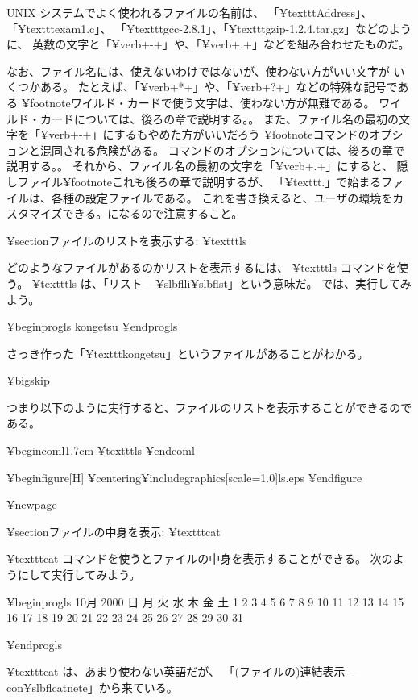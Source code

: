 UNIX システムでよく使われるファイルの名前は、
「¥texttt{Address}」、「¥texttt{exam1.c}」、
「¥texttt{gcc-2.8.1}」、「¥texttt{gzip-1.2.4.tar.gz}」などのように、
英数の文字と「¥verb+-+」や、「¥verb+.+」などを組み合わせたものだ。

なお、ファイル名には、使えないわけではないが、使わない方がいい文字が
いくつかある。
たとえば、「¥verb+*+」や、「¥verb+?+」などの特殊な記号である
¥footnote{ワイルド・カードで使う文字は、使わない方が無難である。
ワイルド・カードについては、後ろの章で説明する。}。
また、ファイル名の最初の文字を「¥verb+-+」にするもやめた方がいいだろう
¥footnote{コマンドのオプションと混同される危険がある。
コマンドのオプションについては、後ろの章で説明する。}。
それから、ファイル名の最初の文字を「¥verb+.+」にすると、
隠しファイル¥footnote{これも後ろの章で説明するが、
「¥texttt{.}」で始まるファイルは、各種の設定ファイルである。
これを書き換えると、ユーザの環境をカスタマイズできる。}になるので注意すること。

¥section{ファイルのリストを表示する: ¥texttt{ls}}

どのようなファイルがあるのかリストを表示するには、 ¥texttt{ls} コマンドを使う。
 ¥texttt{ls} は、「リスト -- ¥slbfl{l}i¥slbfl{s}t」という意味だ。
では、実行してみよう。

¥begin{progls}
kongetsu
%
¥end{progls}

さっき作った「¥texttt{kongetsu}」というファイルがあることがわかる。

¥bigskip

つまり以下のように実行すると、ファイルのリストを表示することができるのである。

¥begin{coml}{1.7cm}
¥texttt{ls}
¥end{coml}

¥begin{figure}[H]
¥centering{¥includegraphics[scale=1.0]{ls.eps}}
¥end{figure}

¥newpage

¥section{ファイルの中身を表示: ¥texttt{cat}}

¥texttt{cat} コマンドを使うとファイルの中身を表示することができる。
次のようにして実行してみよう。

¥begin{progls}
     10月 2000
日 月 火 水 木 金 土
 1  2  3  4  5  6  7
 8  9 10 11 12 13 14
15 16 17 18 19 20 21
22 23 24 25 26 27 28
29 30 31

%
¥end{progls}


 ¥texttt{cat} は、あまり使わない英語だが、
「(ファイルの)連結表示 -- con¥slbfl{cat}nete」から来ている。


